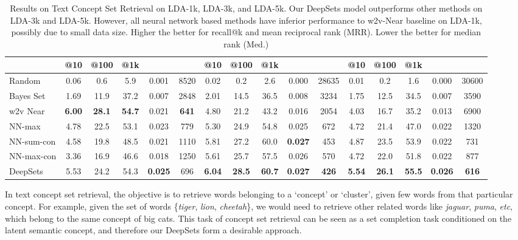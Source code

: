 \documentclass{article}
\newcommand{\latinphrase}[1]{\emph{#1}}    %
\newcommand{\etc}{\latinphrase{etc}\xspace}
\newcommand{\deepsets}{DeepSets\xspace}
\begin{document}
\begin{table}
{{\begin{tabular}{l | ccccc | ccccc | ccccc}
     & \textbf{@10} & \textbf{@100} & \textbf{@1k} & &
     & \textbf{@10} & \textbf{@100} & \textbf{@1k} & &
     & \textbf{@10} & \textbf{@100} & \textbf{@1k} & &
     \\
    \midrule    
    Random & 0.06 & 0.6 & 5.9 & 0.001 & 8520
        & 0.02 & 0.2 & 2.6 & 0.000 & 28635 
        & 0.01 & 0.2 & 1.6 & 0.000 & 30600 
        \\
    Bayes Set & 1.69 & 11.9 & 37.2 & 0.007 & 2848
        & 2.01 & 14.5 & 36.5 & 0.008 & 3234 
        & 1.75 & 12.5 & 34.5 & 0.007 & 3590 
        \\
    w2v Near & \textbf{6.00} & \textbf{28.1} & \textbf{54.7} & 0.021 & \textbf{641}
        & 4.80 & 21.2 & 43.2 & 0.016 & 2054 
        & 4.03 & 16.7 & 35.2 & 0.013 & 6900 
        \\
    NN-max & 4.78 & 22.5 & 53.1 & 0.023 & 779 
        & 5.30 & 24.9 & 54.8 & 0.025 & 672 
        & 4.72 & 21.4 & 47.0 & 0.022 & 1320 
        \\
    NN-sum-con & 4.58 & 19.8 & 48.5 & 0.021 & 1110
        & 5.81 & 27.2 & 60.0 &\textbf{ 0.027} & 453
        & 4.87 & 23.5 & 53.9 & 0.022 & 731
        \\
    NN-max-con & 3.36 & 16.9 & 46.6 & 0.018 & 1250 
        & 5.61 & 25.7 & 57.5 & 0.026 & 570
        & 4.72 & 22.0 & 51.8 & 0.022 & 877
        \\
    \deepsets & 5.53 & 24.2 & 54.3 & \textbf{0.025} & 696
        & \textbf{6.04} & \textbf{28.5} & \textbf{60.7} & \textbf{0.027} & \textbf{426}
        & \textbf{5.54} & \textbf{26.1} & \textbf{55.5} & \textbf{0.026} & \textbf{616}
        \\
    \bottomrule
    \end{tabular}}}
    \caption{\small Results on Text Concept Set Retrieval on LDA-1k, LDA-3k, and LDA-5k. Our \deepsets model outperforms other methods on LDA-3k and LDA-5k. However, all neural network based methods have inferior performance to w2v-Near baseline on LDA-1k, possibly due to small data size. Higher the better for recall@k and mean reciprocal rank (MRR). Lower the better for median rank (Med.)}
    \label{tab:lda-result-table}
    \vspace{-5mm}
\end{table}

In text concept set retrieval, the objective is to retrieve words belonging to a `concept' or `cluster', given few words from that particular concept. For example, given the set of words \{\emph{tiger}, \emph{lion}, \emph{cheetah}\}, we would need to retrieve other related words like \emph{jaguar}, \emph{puma}, \etc, which belong to the same concept of big cats. This task of concept set retrieval can be seen as a set completion task conditioned on the latent semantic concept, and therefore our \deepsets form a desirable approach.
\end{document}
